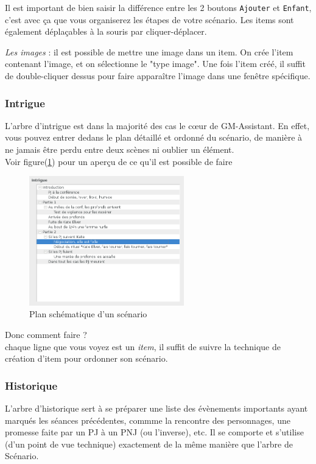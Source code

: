 \documentclass[a4paper,12pt]{article}
\newcommand*{\GMA}{GM-Assistant\xspace}
\newcommand*{\interfaceitem}[1]{\texttt{#1}}
\newcommand*{\guillemets}[1]{\og #1\fg{}\xspace}
\begin{document}
Il est important de bien saisir la différence entre les 2 boutons \interfaceitem{Ajouter} et \interfaceitem{Enfant}, c'est avec ça que vous organiserez les étapes de votre scénario.
Les items sont également déplaçables à la souris par \guillemets{cliquer-déplacer}.

\emph{Les images} : il est possible de mettre une image dans un item. On crée l'item contenant l'image, et on sélectionne le "type image". Une fois l'item créé, il suffit de double-cliquer dessus pour faire apparaître l'image dans une fenêtre spécifique.

\subsubsection{Intrigue}
\label{sec:intrigue}

L'arbre d'intrigue est dans la majorité des cas le cœur de \GMA.
En effet, vous pouvez entrer dedans le plan détaillé et ordonné du scénario, de manière à ne jamais être perdu entre deux scènes ni oublier un élément.
\\
Voir figure(\ref{arbre_scenar}) pour un aperçu de ce qu'il est possible de faire
\begin{figure}[h]
    \includegraphics[width=0.6\textwidth]{scenario_type}
    \caption{Plan schématique d'un scénario}
    \label{arbre_scenar}
\end{figure}
Donc comment faire ?
\\
chaque ligne que vous voyez est un \emph{item}, il suffit de suivre la technique de création d'item pour ordonner son scénario.

\subsubsection{Historique}
\label{sec:historique}

L'arbre d'historique sert à se préparer une liste des évènements importants ayant marqués les séances précédentes, commme la rencontre des personnages, une promesse faite par un PJ à un PNJ (ou l'inverse), etc.
Il se comporte et s'utilise (d'un point de vue technique) exactement de la même manière que l'arbre de Scénario.
\end{document}
